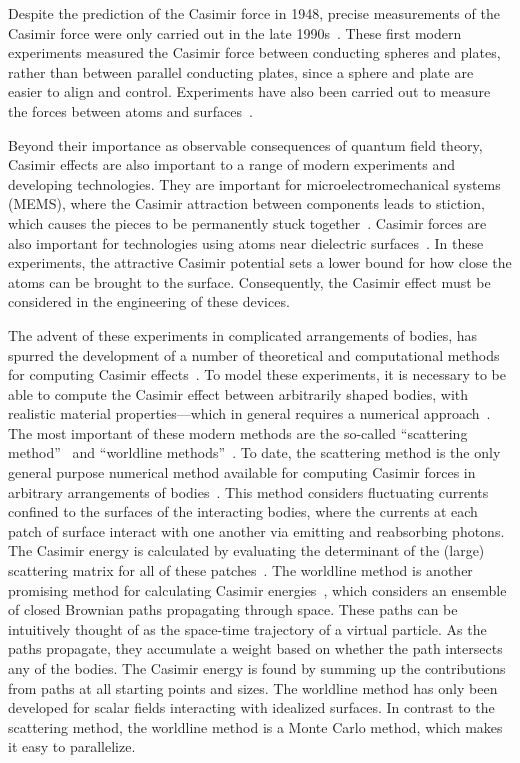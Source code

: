 Despite the prediction of the Casimir force in 1948, precise measurements of the Casimir force were only
carried out in the late 1990s~\citep{Lamoreaux1997,Mohideen1998}.  
These first modern experiments measured the Casimir force between conducting spheres and plates, 
rather than between parallel conducting plates, since a sphere and plate are easier to align and control. 
Experiments have also been carried out to measure the forces between atoms and surfaces~\citep{Sukenik1993,Perreault2005,Harber2005}.

Beyond their importance as observable consequences of quantum field theory, Casimir effects are also 
important to a range of modern experiments and developing technologies.
They are important for microelectromechanical systems (MEMS), where the Casimir attraction between components 
leads to stiction, which causes the pieces to be permanently stuck together~\citep{Buks2001}.  
Casimir forces are also important for technologies using atoms near dielectric surfaces~\citep{Folman2000,Alton2011, Hung2013}.
In these experiments, the attractive Casimir potential sets a lower bound for how
close the atoms can be brought to the surface.  Consequently, the Casimir effect must be considered in the engineering 
of these devices.

The advent of these experiments in complicated arrangements of bodies, has spurred the development
of a number of theoretical and computational methods for computing Casimir effects~\citep{Dalvit2011,Bordag2009}. 
To model these experiments, it is necessary to be able to compute the Casimir effect between arbitrarily shaped bodies, with 
realistic material properties---which in general requires a numerical approach~\citep{Johnson2011}.
The most important of these modern methods are the so-called ``scattering method''~\citep{Lambrecht2006,Rahi2009,Reid2009}
 and ``worldline methods''~\citep{Gies2003}.
To date, the scattering method is the only general purpose numerical method available for computing
Casimir forces in arbitrary arrangements of bodies~\citep{Reid2009,Reid2011,Reid2013}.  
This method considers fluctuating currents confined to the surfaces of the interacting bodies,
where the currents at each patch of surface interact with one another via emitting and reabsorbing photons.
The Casimir energy is calculated by evaluating the determinant of the (large) scattering matrix for all of these patches~\citep{Reid2011}.  
The worldline method is another promising method for calculating Casimir energies~\citep{Gies2003},
which considers an ensemble of closed Brownian paths propagating through space.
These paths can be intuitively thought of as the space-time trajectory of a virtual particle.
As the paths propagate, they accumulate a weight based on whether the path intersects any of the 
bodies.  The Casimir energy is found by summing up the contributions from paths at all starting points
and sizes.   
The worldline method has only been developed for scalar fields interacting with idealized surfaces.
In contrast to the scattering method, the worldline method is a Monte Carlo method, which makes it 
easy to parallelize.  

